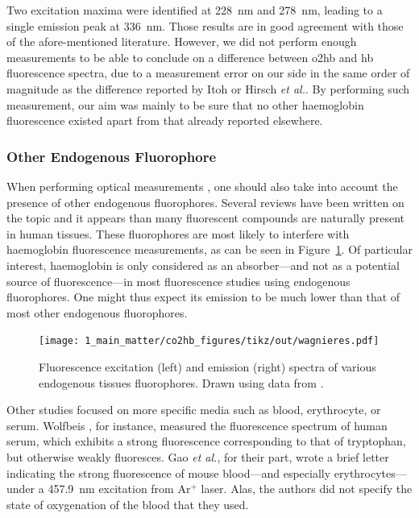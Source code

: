 Two excitation maxima were identified at 228~nm and 278~nm, leading to a single emission peak at 336~nm. Those results are in good agreement with those of the afore-mentioned literature\cite{hirsch1980, alpert1980}. However, we did not perform enough measurements to be able to conclude on a difference between \gls{o2hb} and \gls{hb} fluorescence spectra, due to a measurement error on our side in the same order of magnitude as the difference reported by Itoh \etal{}\cite{itoh1981} or Hirsch \textit{et al.}\cite{hirsch1981}. By performing such measurement, our aim was mainly to be sure that no other haemoglobin fluorescence existed apart from that already reported elsewhere.

\subsubsection{Other Endogenous Fluorophore}

When performing optical measurements \invivo{}, one should also take into account the presence of other endogenous fluorophores. Several reviews have been written on the topic\cite{wagnieres1998, vishwanath2011} and it appears than many fluorescent compounds are naturally present in human tissues. These fluorophores are most likely to interfere with haemoglobin fluorescence measurements, as can be seen in Figure~\ref{fig:co2hb:wagnieres_fig}. Of particular interest, haemoglobin is only considered as an absorber---and not as a potential source of fluorescence---in most fluorescence studies using endogenous fluorophores. One might thus expect its emission to be much lower than that of most other endogenous fluorophores\cite{kollias2002}.

\begin{figure}
	\centering
	\texttt{[image: 1\_main\_matter/co2hb\_figures/tikz/out/wagnieres.pdf]}
	\caption[Fluorescence excitation and emission spectra of various endogenous tissues fluorophores.]{Fluorescence excitation (left) and emission (right) spectra of various endogenous tissues fluorophores. Drawn using data from \cite{wagnieres1998}.}
	\label{fig:co2hb:wagnieres_fig}
\end{figure}

Other studies focused on more specific media such as blood, erythrocyte, or serum. Wolfbeis \etal{}, for instance, measured the fluorescence spectrum of human serum, which exhibits a strong fluorescence corresponding to that of tryptophan, but otherwise weakly fluoresces\cite{wolfbeis1985}. Gao \textit{et al.}\cite{gao2004}, for their part, wrote a brief letter indicating the strong fluorescence of mouse blood---and especially erythrocytes---under a 457.9~nm excitation from Ar$^+$ laser. Alas, the authors did not specify the state of oxygenation of the blood that they used.

